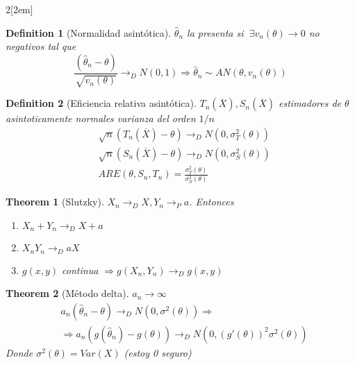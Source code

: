 \documentclass[leqno]{article}
\newtheorem*{theorem}{Theorem}
\newtheorem*{definition}{Definition}
\begin{document}
\begin{multicols}{2}[\columnsep2em]
\begin{definition}[Normalidad asintótica]  $\hat{\theta }_n$ la presenta si $\ \exists v_n(\theta ) \to  0$ no negativos tal que
  \[
	\frac{(\hat{\theta }_n-\theta )}{\sqrt{v_n(\theta )} } \to_D N(0,1) \Rightarrow \hat{\theta }_n \sim AN(\theta , v_n(\theta ))
  \] 
\end{definition}

\begin{definition}[Eficiencia relativa asintótica] $T_n(\overline{X}), S_n(\overline{X})$ estimadores de $\theta$ asintoticamente normales varianza del orden $1 / n$
  \begin{align*}
	 &\sqrt{n}(T_n(\overline{X})-\theta )  \to _D N(0, \sigma_T^2(\theta)) \\
	 &\sqrt{n}(S_n(\overline{X})-\theta )  \to _D N(0, \sigma_S^2(\theta)) \\
	 &ARE(\theta, S_n, T_n) = \frac{\sigma ^2_T(\theta )}{\sigma ^2_S(\theta )}
  \end{align*}

\end{definition}

\begin{theorem}[Slutzky] $X_n \to _D X, Y_n \to _P a$. Entonces
  \begin{enumerate}[topsep=-6pt, itemsep=0pt]
	\item $X_n + Y_n \to _D X+a$ 
	\item $X_nY_n \to _D aX$
	\item $g(x,y)$ continua  $\Rightarrow g(X_n, Y_n) \to _D g(x,y)$
  \end{enumerate}
\end{theorem}

\begin{theorem}[Método delta] $a_n \to \infty$
  \begin{align*}
  &a_n(\hat{\theta }_n-\theta ) \to _D N(0, \sigma ^2(\theta )) \Rightarrow \\
  & \Rightarrow a_n(g(\hat{\theta }_n)-g(\theta) ) \to _D N(0, (g'(\theta ))^2 \sigma ^2(\theta ))
  \end{align*}
  Donde $\sigma ^2(\theta) = Var(X)$ (estoy 0 seguro)
\end{theorem}


\end{multicols}
\end{document}
